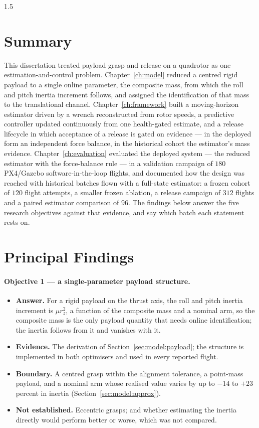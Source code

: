 \begin{spacing}{1.5}
\setlength{\parskip}{0.22in}

\section{Summary}

This dissertation treated payload grasp and release on a quadrotor as one
estimation-and-control problem. Chapter~\ref{ch:model} reduced a centred rigid
payload to a single online parameter, the composite mass, from which the roll
and pitch inertia increment follows, and assigned the identification of that
mass to the translational channel. Chapter~\ref{ch:framework} built a
moving-horizon estimator driven by a wrench reconstructed from rotor speeds, a
predictive controller updated continuously from one health-gated estimate, and a
release lifecycle in which acceptance of a release is gated on evidence --- in
the deployed form an independent force balance, in the historical cohort the
estimator's mass evidence. Chapter~\ref{ch:evaluation}
evaluated the deployed system --- the reduced estimator with the force-balance
rule --- in a validation campaign of $180$ PX4/Gazebo software-in-the-loop
flights, and documented how the design was reached with historical batches flown
with a full-state estimator: a frozen cohort of $120$ flight attempts, a smaller
frozen ablation, a release campaign of $312$ flights and a paired estimator
comparison of $96$. The findings below answer the five research objectives
against that evidence, and say which batch each statement rests on.

\section{Principal Findings}

\paragraph{Objective 1 --- a single-parameter payload structure.}
\begin{itemize}
\item \textbf{Answer.} For a rigid payload on the thrust axis, the roll and pitch
inertia increment is $\mu r_z^2$, a function of the composite mass and a nominal
arm, so the composite mass is the only payload quantity that needs online
identification; the inertia follows from it and vanishes with it.
\item \textbf{Evidence.} The derivation of Section~\ref{sec:model:payload}; the
structure is implemented in both optimisers and used in every reported flight.
\item \textbf{Boundary.} A centred grasp within the alignment tolerance, a
point-mass payload, and a nominal arm whose realised value varies by up to
$-14$ to $+23$ percent in inertia (Section~\ref{sec:model:approx}).
\item \textbf{Not established.} Eccentric grasps; and whether estimating the
inertia directly would perform better or worse, which was not compared.
\end{itemize}


\end{spacing}
